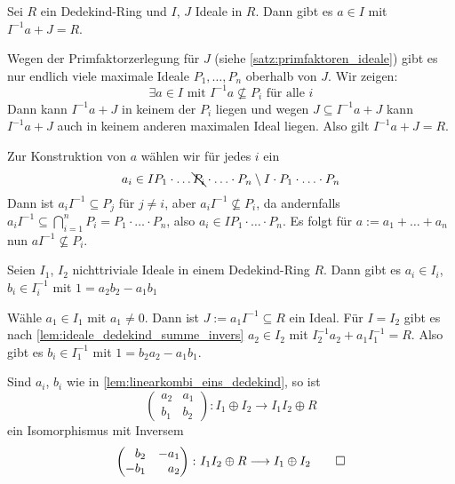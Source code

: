 \begin{lemma}[label=lem:ideale_dedekind_summe_invers]
    Sei $R$ ein Dedekind-Ring und $I$, $J$ Ideale in $R$.
    Dann gibt es $a \in I$ mit $I^{-1}a + J = R$.
\end{lemma}
\begin{beweis}
    Wegen der Primfaktorzerlegung für $J$ (siehe \autoref{satz:primfaktoren_ideale}) gibt es nur endlich viele maximale Ideale $P_1, \ldots ,P_n$ oberhalb von $J$.
    Wir zeigen: 
    \[
        \exists a \in I  \text{ mit } I^{-1}a \not\subseteq P_i \text{ für alle } i
    \]
    Dann kann $I^{-1}a +J$ in keinem der $P_i$ liegen und wegen $J \subseteq I^{-1}a + J$ kann $I^{-1}a +J$ auch in keinem anderen maximalen Ideal liegen.
    Also gilt $I^{-1}a +J=R$.
    
    Zur Konstruktion von $a$ wählen wir für jedes $i$ ein 
    \[
        a_i \in I P_1 \cdot \ldots \bcancel{P_i} \cdot \ldots \cdot P_n \setminus I \cdot P_1 \cdot \ldots \cdot P_n
    \]
    Dann ist $a_i I^{-1} \subseteq P_j$ für $j\neq i$, aber $a_iI^{-1} \not\subseteq P_i$, da andernfalls $a_i I^{-1} \subseteq \bigcap_{i=1}^n P_i = P_1 \cdot \ldots \cdot P_n$, also $a_i \in IP_1 \cdot \ldots \cdot P_n$.
    Es folgt für $a := a_1 + \ldots +a_n$ nun
    \(
        a I^{-1} \not\subseteq P_i
    \).
\end{beweis}

\begin{lemma}[label=lem:linearkombi_eins_dedekind]
    Seien $I_1$, $I_2$ nichttriviale Ideale in einem Dedekind-Ring $R$.
    Dann gibt es $a_i \in I_i$, $b_i \in I^{-1}_i$ mit $1 = a_2 b_2 -a_1 b_1$
\end{lemma}
\begin{beweis}
    Wähle $a_1 \in I_1$ mit $a_1 \neq 0$.
    Dann ist $J := a_1 I^{-1} \subseteq R$ ein Ideal.
    Für $I=I_2$ gibt es nach \autoref{lem:ideale_dedekind_summe_invers} $a_2 \in I_2$ mit $I^{-1}_2 a_2 + a_1 I_1^{-1} =R$.
    Also gibt es $b_i \in I_1^{-1}$ mit $1 = b_2 a_2 - a_1 b_1$.
\end{beweis}

\begin{beweis}[{name={von \autoref{prop:summe_ideale}}}]
    Sind $a_i$, $b_i$ wie in \autoref{lem:linearkombi_eins_dedekind}, so ist
    \[
        \begin{pmatrix}
            a_2 & a_1 \\
            b_1 & b_2
        \end{pmatrix} \colon I_1 \oplus I_2 \longrightarrow I_1 I_2 \oplus R
    \]
    ein Isomorphismus mit Inversem
    \[
        \begin{pmatrix*}[r]
            b_2 & -a_1 \\
            -b_1 & a_2
        \end{pmatrix*} \colon I_1 I_2 \oplus R \longrightarrow I_1 \oplus I_2 \qedhere
    \]
\end{beweis}

